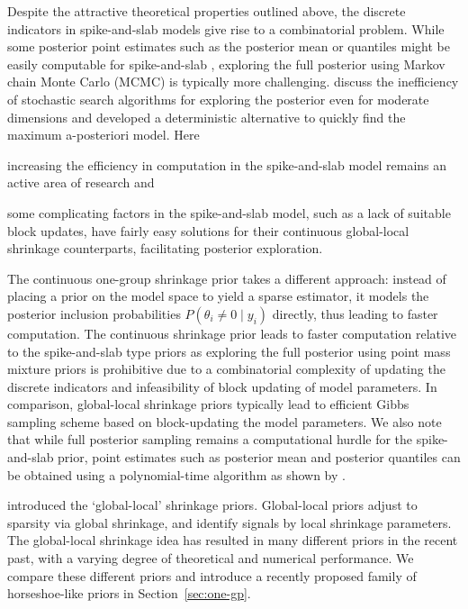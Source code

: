 \documentclass[sts,preprint]{imsart}
\begin{document}
Despite the \textcolor[rgb]{1,0,0}{attractive theoretical properties} outlined above, the discrete indicators in spike-and-slab models give rise to a combinatorial problem. While some posterior point estimates such as the posterior mean or quantiles might be easily computable for spike-and-slab \citep{castillo2012needles, castillo2015bayesian}, exploring the full posterior using Markov chain Monte Carlo (MCMC) is typically more challenging. \citet{rovckova2016spike} discuss the inefficiency of stochastic search algorithms for exploring the posterior even for moderate dimensions and developed a deterministic alternative to quickly find the maximum a-posteriori model. Here 
\begin{enumerate*}
  \item increasing the efficiency in computation in the spike-and-slab model
    remains an active area of research \citep[see, e.g., ][]{rovckova2016spike}
    and
  \item some complicating factors in the spike-and-slab model, such as a lack of suitable block updates, have fairly easy solutions for their continuous global-local shrinkage counterparts, facilitating posterior exploration. 
\end{enumerate*}

The continuous one-group shrinkage prior takes a different approach: instead of  placing a prior on the model space to yield a sparse estimator, it models the posterior inclusion probabilities $P(\theta_i \ne 0 \mid y_i)$ directly, thus leading to faster computation. The continuous shrinkage prior leads to faster computation relative to the spike-and-slab type priors as exploring the full posterior using point mass mixture priors is prohibitive due to a combinatorial complexity of updating the discrete indicators and infeasibility of block updating of model parameters. In comparison, global-local shrinkage priors typically lead to efficient Gibbs sampling scheme based on block-updating the model parameters. We also note that while full posterior sampling remains a computational hurdle for the spike-and-slab prior, point estimates such as posterior mean and posterior quantiles can be obtained using a polynomial-time algorithm as shown by \citet{castillo2012needles}.


\citet{carvalho2009handling, polson2010shrink, carvalho2010horseshoe, polson2012half} introduced the `global-local' shrinkage priors. Global-local priors adjust to sparsity via global shrinkage, and identify signals by local shrinkage parameters. The global-local shrinkage idea has resulted in many different priors in the recent
past, with a varying degree of theoretical and numerical performance. We compare these different priors and introduce a recently proposed family of horseshoe-like priors in Section~\ref{sec:one-gp}.   
\end{document}
